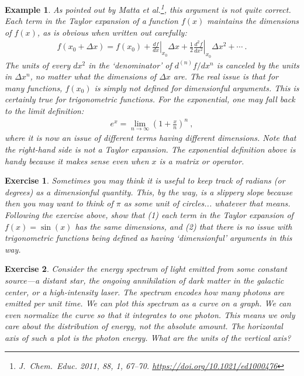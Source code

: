 \documentclass[
  11pt,
	colorful,
	raggedright,
]{tufte-style-thesis-flip}
\newtheorem{exercise}{Exercise}[section]
\newtheorem{example}{Example}[section]
\begin{document}
\begin{example}
As pointed out by Matta et al.\footnote{\emph{J.~Chem.~Educ.} 2011, 88, 1, 67–70. \url{https://doi.org/10.1021/ed1000476}}, this argument is not quite correct. Each term in the Taylor expansion of a function $f(x)$ maintains the dimensions of $f(x)$, as is obvious when written out carefully:
\begin{align}
  f(x_0+\Delta x) = f(x_0) + \left.\frac{df}{dx}\right|_{x_0}\Delta x + \frac{1}{2}\left.\frac{d^2f}{dx^2}\right|_{x_0}\Delta x^2 + \cdots \ .
\end{align}
The units of every $dx^2$ in the `denominator' of $d^{(n)}f/dx^n$ is canceled by the units in $\Delta x^n$, no matter what the dimensions of $\Delta x$ are.
%
The real issue is that for many functions, $f(x_0)$ is simply not defined for dimensionful arguments. This is certainly true for trigonometric functions. For the exponential, one may fall back to the limit definition:
\begin{align}
  e^x = \lim_{n\to\infty} \left(1+ \frac{x}{n}\right)^n \ ,
\end{align}
where it is now an issue of different terms having different dimensions. Note that the right-hand side is not a Taylor expansion. The exponential definition above is handy because it makes sense even when $x$ is a matrix or operator.
\end{example}

\begin{exercise}
Sometimes you may think it is useful to keep track of radians (or degrees) as a dimensionful quantity. This, by the way, is a slippery slope because then you may want to think of $\pi$ as some unit of circles... whatever that means. Following the exercise above, show that (1) each term in the Taylor expansion of $f(x) = \sin(x)$ has the same dimensions, and (2) that there is no issue with trigonometric functions being defined as having `dimensionful' arguments in this way.
\end{exercise}

\begin{exercise}
Consider the energy spectrum of light emitted from some constant source---a distant star, the ongoing annihilation of dark matter in the galactic center, or a high-intensity laser. The spectrum encodes how many photons are emitted per unit time. We can plot this spectrum as a curve on a graph. We can even normalize the curve so that it integrates to one photon. This means we only care about the distribution of energy, not the absolute amount. The horizontal axis of such a plot is the photon energy. What are the units of the vertical axis?
\end{exercise}
\end{document}
